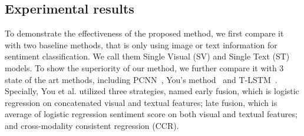 \documentclass{article}
\begin{document}

\vspace{-0.3cm}
  \subsection{Experimental results}
 \label{ssec:subhead}
To demonstrate the effectiveness of the proposed method, we first compare it with two baseline methods, that is only \mbox{using} image or text information for sentiment classification. We call them Single Visual (SV) and Single Text (ST) models. To show the superiority of our method, we further compare it with 3 state of the art methods, including PCNN~\cite{you2015robust}, You's method~\cite{you2016cross} and T-LSTM~\cite{you2016robust}. Specially, You et al. utilized three strategies, named early fusion, which is logistic regression on concatenated visual and textual features; late fusion, which is average of logistic regression sentiment {} score on both visual and textual features; and cross-modality consistent regression (CCR).

\end{document}
